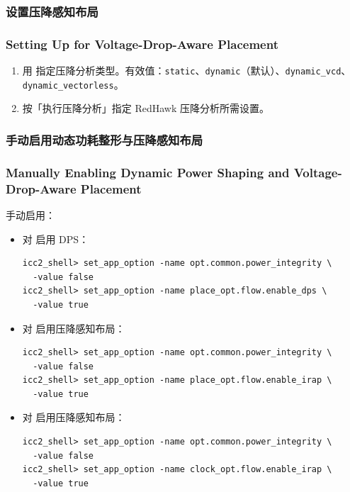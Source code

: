 \subsubsection{设置压降感知布局}
\subsubsection*{Setting Up for Voltage-Drop-Aware Placement}

\begin{enumerate}
  \item 用  指定压降分析类型。有效值：\texttt{static}、\texttt{dynamic}（默认）、\texttt{dynamic\_vcd}、\texttt{dynamic\_vectorless}。
  \item 按「执行压降分析」指定 RedHawk 压降分析所需设置。
\end{enumerate}

\subsubsection{手动启用动态功耗整形与压降感知布局}
\subsubsection*{Manually Enabling Dynamic Power Shaping and Voltage-Drop-Aware Placement}

手动启用：
\begin{itemize}
  \item 对  启用 DPS：
\begin{lstlisting}
icc2_shell> set_app_option -name opt.common.power_integrity \
  -value false
icc2_shell> set_app_option -name place_opt.flow.enable_dps \
  -value true
\end{lstlisting}
  \item 对  启用压降感知布局：
\begin{lstlisting}
icc2_shell> set_app_option -name opt.common.power_integrity \
  -value false
icc2_shell> set_app_option -name place_opt.flow.enable_irap \
  -value true
\end{lstlisting}
  \item 对  启用压降感知布局：
\begin{lstlisting}
icc2_shell> set_app_option -name opt.common.power_integrity \
  -value false
icc2_shell> set_app_option -name clock_opt.flow.enable_irap \
  -value true
\end{lstlisting}
\end{itemize}

